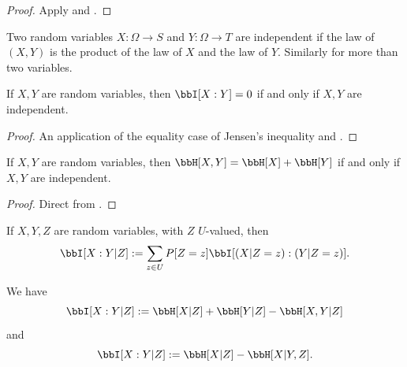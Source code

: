 \begin{proof}  \leanok Apply  and .
\end{proof}

\begin{definition}
  \label{independent-def}
  \leanok
  Two random variables $X: \Omega \to S$ and $Y: \Omega \to T$ are independent if the law of $(X,Y)$ is the product of the law of $X$ and the law of $Y$.  Similarly for more than two variables.
\end{definition}

\begin{lemma}
  \label{vanish-entropy}
  \leanok
  If $X,Y$ are random variables, then $\bbI[X:Y] = 0$ if and only if $X,Y$ are independent.
  \end{lemma}

  \begin{proof}
    \leanok

    An application of the equality case of Jensen's inequality and .
  \end{proof}

\begin{corollary}\label{add-entropy}
  \leanok
  If $X,Y$ are random variables, then $\bbH[X,Y] = \bbH[X] + \bbH[Y]$ if and only if $X,Y$ are independent.
\end{corollary}

\begin{proof} \leanok
  Direct from .
\end{proof}

\begin{definition}
\label{conditional-mutual-def}
\leanok
If $X,Y,Z$ are random variables, with $Z$ $U$-valued, then
$$ \bbI[X:Y|Z] := \sum_{z \in U} P[Z=z] \bbI[(X|Z=z): (Y|Z=z)].$$
\end{definition}

\begin{lemma}
  \label{conditional-mutual-alt}
  \leanok
We have
  $$ \bbI[X:Y|Z] := \bbH[X|Z] + \bbH[Y|Z] - \bbH[X,Y|Z]$$
and
  $$ \bbI[X:Y|Z] := \bbH[X|Z] - \bbH[X|Y,Z].$$
\end{lemma}

